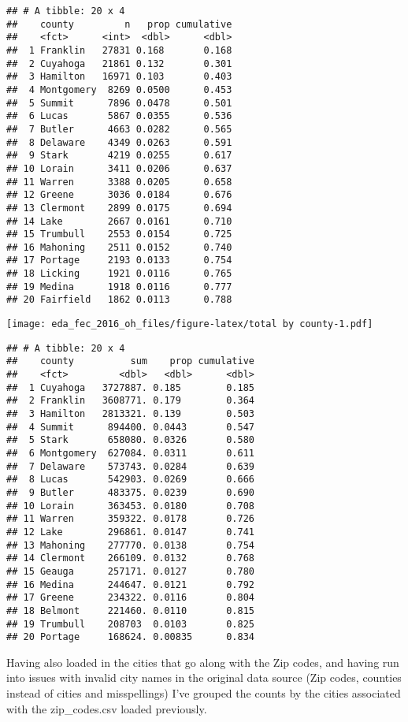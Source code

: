 \documentclass[]{article}
\begin{document}
\begin{verbatim}
## # A tibble: 20 x 4
##    county         n   prop cumulative
##    <fct>      <int>  <dbl>      <dbl>
##  1 Franklin   27831 0.168       0.168
##  2 Cuyahoga   21861 0.132       0.301
##  3 Hamilton   16971 0.103       0.403
##  4 Montgomery  8269 0.0500      0.453
##  5 Summit      7896 0.0478      0.501
##  6 Lucas       5867 0.0355      0.536
##  7 Butler      4663 0.0282      0.565
##  8 Delaware    4349 0.0263      0.591
##  9 Stark       4219 0.0255      0.617
## 10 Lorain      3411 0.0206      0.637
## 11 Warren      3388 0.0205      0.658
## 12 Greene      3036 0.0184      0.676
## 13 Clermont    2899 0.0175      0.694
## 14 Lake        2667 0.0161      0.710
## 15 Trumbull    2553 0.0154      0.725
## 16 Mahoning    2511 0.0152      0.740
## 17 Portage     2193 0.0133      0.754
## 18 Licking     1921 0.0116      0.765
## 19 Medina      1918 0.0116      0.777
## 20 Fairfield   1862 0.0113      0.788
\end{verbatim}

\texttt{[image: eda\_fec\_2016\_oh\_files/figure-latex/total by county-1.pdf]}

\begin{verbatim}
## # A tibble: 20 x 4
##    county          sum    prop cumulative
##    <fct>         <dbl>   <dbl>      <dbl>
##  1 Cuyahoga   3727887. 0.185        0.185
##  2 Franklin   3608771. 0.179        0.364
##  3 Hamilton   2813321. 0.139        0.503
##  4 Summit      894400. 0.0443       0.547
##  5 Stark       658080. 0.0326       0.580
##  6 Montgomery  627084. 0.0311       0.611
##  7 Delaware    573743. 0.0284       0.639
##  8 Lucas       542903. 0.0269       0.666
##  9 Butler      483375. 0.0239       0.690
## 10 Lorain      363453. 0.0180       0.708
## 11 Warren      359322. 0.0178       0.726
## 12 Lake        296861. 0.0147       0.741
## 13 Mahoning    277770. 0.0138       0.754
## 14 Clermont    266109. 0.0132       0.768
## 15 Geauga      257171. 0.0127       0.780
## 16 Medina      244647. 0.0121       0.792
## 17 Greene      234322. 0.0116       0.804
## 18 Belmont     221460. 0.0110       0.815
## 19 Trumbull    208703  0.0103       0.825
## 20 Portage     168624. 0.00835      0.834
\end{verbatim}

Having also loaded in the cities that go along with the Zip codes, and
having run into issues with invalid city names in the original data
source (Zip codes, counties instead of cities and misspellings) I've
grouped the counts by the cities associated with the zip\_codes.csv
loaded previously.
\end{document}
